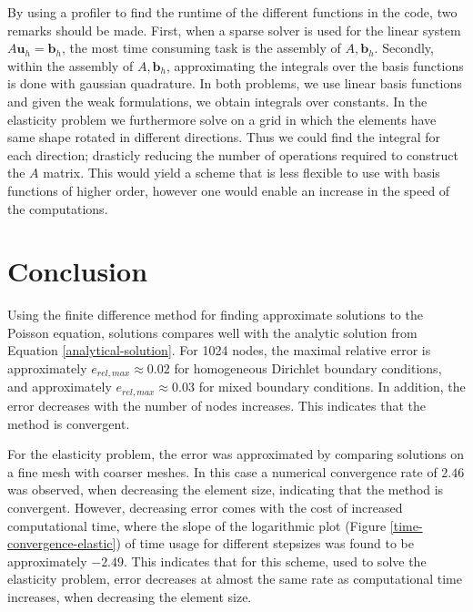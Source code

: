 \documentclass[5pt,a4paper,english]{elsarticle}%
\begin{document}
By using a profiler to find the runtime of the different functions in the code, two remarks should be made. First, when a sparse solver is used for the linear system $A \bm u_h = \bm b_h$, the most time consuming task is the assembly of $A,\bm b_h$. Secondly, within the assembly of $A,\bm b_h$, approximating the integrals over the basis functions is done with gaussian quadrature. In both problems, we use linear basis functions and given the weak formulations, we obtain integrals over constants. In the elasticity problem we furthermore solve on a grid in which the elements have same shape rotated in different directions. Thus we could find the integral for each direction; drasticly reducing the number of operations required to construct the $A$ matrix. This would yield a scheme that is less flexible to use with basis functions of higher order, however one would enable an increase in the speed of the computations. 
   
\section{Conclusion}

Using the finite difference method for finding approximate solutions to the Poisson equation, solutions compares well with the analytic solution from Equation \eqref{analytical-solution}. For 1024 nodes, the maximal relative error is approximately $e_{rel,max} \approx 0.02$ for homogeneous Dirichlet boundary conditions, and approximately $e_{rel,max} \approx 0.03$ for mixed boundary conditions. In addition, the error decreases with the number of nodes increases. This indicates that the method is convergent.

For the elasticity problem, the error was approximated by comparing solutions on a fine mesh with coarser meshes. In this case a numerical convergence rate of $2.46$ was observed, when decreasing the element size, indicating that the method is convergent. However, decreasing error comes with the cost of increased computational time, where the slope of the logarithmic plot (Figure \ref{time-convergence-elastic}) of time usage for different stepsizes was found to be approximately $-2.49$. This indicates that for this scheme, used to solve the elasticity problem, error decreases at almost the same rate as computational time increases, when decreasing the element size.
	


\end{document}

